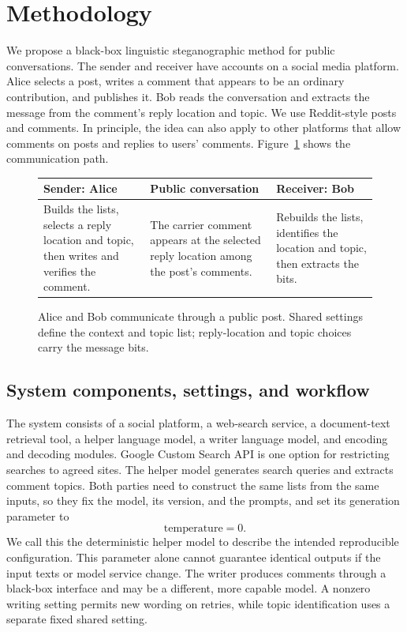 \section{Methodology}
\label{sec:methodology}

We propose a black-box linguistic steganographic method for public conversations.
The sender and receiver have accounts on a social media platform. Alice selects a post, writes a comment that appears to be an ordinary contribution, and publishes it. Bob reads the conversation and extracts the message from the comment's reply location and topic.
We use Reddit-style posts and comments. In principle, the idea can also apply to other platforms that allow comments on posts and replies to users' comments.
Figure~\ref{fig:end-to-end} shows the communication path.

\begin{figure}[H]
\centering\small
\begin{tabularx}{\linewidth}{|X|X|X|}
\hline
Sender: Alice & Public conversation & Receiver: Bob \\
\hline
Builds the lists, selects a reply location and topic, then writes and verifies the comment. & The carrier comment appears at the selected reply location among the post's comments. & Rebuilds the lists, identifies the location and topic, then extracts the bits. \\
\hline
\end{tabularx}
\caption{Alice and Bob communicate through a public post. Shared settings define the context and topic list; reply-location and topic choices carry the message bits.}
\label{fig:end-to-end}
\end{figure}

\subsection{System components, settings, and workflow}
\label{sec:method-setup}
The system consists of a social platform, a web-search service, a document-text retrieval tool, a helper language model, a writer language model, and encoding and decoding modules.
Google Custom Search API is one option for restricting searches to agreed sites.
The helper model generates search queries and extracts comment topics. Both parties need to construct the same lists from the same inputs, so they fix the model, its version, and the prompts, and set its generation parameter to
\[
\mathrm{temperature}=0.
\]
We call this the deterministic helper model to describe the intended reproducible configuration. This parameter alone cannot guarantee identical outputs if the input texts or model service change.
The writer produces comments through a black-box interface and may be a different, more capable model. A nonzero writing setting permits new wording on retries, while topic identification uses a separate fixed shared setting.

